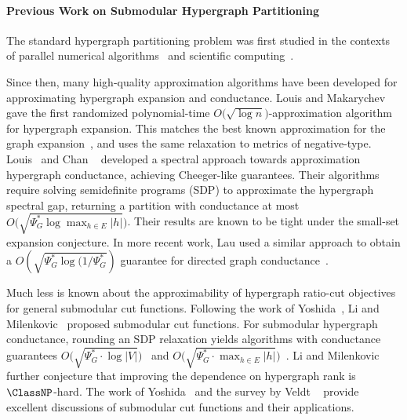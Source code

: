 \documentclass[letterpaper]{article}
\begin{document}
\paragraph{Previous Work on Submodular Hypergraph Partitioning}
The standard hypergraph partitioning problem was first studied in the contexts of parallel numerical algorithms~\cite{catalyurekHypergraphpartitioningbasedDecompositionParallel1999} and scientific computing~\cite{devineParallelHypergraphPartitioning2006}.

Since then, many high-quality approximation algorithms have been developed for approximating hypergraph expansion and conductance. Louis and Makarychev~\cite{louis2016approximation} gave the first randomized polynomial-time $O\big( \sqrt{\log n} \big)$-approximation algorithm for hypergraph expansion. This matches the best known approximation for the graph expansion~\cite{ARV2009}, and uses the same relaxation to metrics of negative-type. Louis~\cite{louis2015hypergraph} and Chan \etal~\cite{chan2018spectral} developed a spectral approach towards approximation hypergraph conductance, achieving Cheeger-like guarantees. Their algorithms require solving semidefinite programs (SDP) to approximate the hypergraph spectral gap, returning a partition with conductance at most $O\big( \sqrt{\Psi^*_G \log \max_{h \in E} |h|} \big)$. Their results are known to be tight under the small-set expansion conjecture. In more recent work, Lau \etal used a similar approach to obtain a $O(\sqrt{\Psi^*_G \log(1/\Psi^*_G})$ guarantee for directed graph conductance~\cite{lau2022cheeger}.

Much less is known about the approximability of hypergraph ratio-cut objectives for general submodular cut functions. Following the work of Yoshida~\cite{yoshidaCheegerInequalitiesSubmodular2018}, Li and Milenkovic~\cite{li2017inhomogeneous, liSubmodularHypergraphsPLaplacians2018} proposed submodular cut functions. For submodular hypergraph conductance, rounding an SDP relaxation yields algorithms with conductance guarantees $O\big( \sqrt{\Psi^*_G \cdot \log |V|} \big)$~\cite{yoshidaCheegerInequalitiesSubmodular2018} and $O\big( \sqrt{\Psi^*_G \cdot \max_{h \in E} |h|} \big)$~\cite{liSubmodularHypergraphsPLaplacians2018}. Li and Milenkovic~\cite{liSubmodularHypergraphsPLaplacians2018} further conjecture that improving the dependence on hypergraph rank is $\ClassNP$-hard. The work of Yoshida~\cite{yoshidaCheegerInequalitiesSubmodular2018} and the survey by Veldt \etal~\cite{veldtHypergraphCutsGeneral2020} provide excellent discussions of submodular cut functions and their applications.
\end{document}
